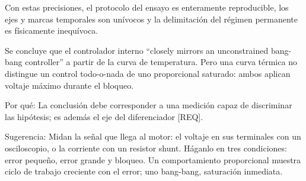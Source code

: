 \documentclass{LabDSTresponse}
\begin{document}
{\begin{enumerate}
\end{enumerate}
Con estas precisiones, el protocolo del ensayo es enteramente reproducible, los ejes y marcas temporales son unívocos y la delimitación del régimen permanente es físicamente inequívoca.}

{Se concluye que el controlador interno “closely mirrors an unconstrained bang-bang controller” a partir de la curva de temperatura. Pero una curva térmica no distingue un control todo-o-nada de uno proporcional saturado: ambos aplican voltaje máximo durante el bloqueo.

Por qué: La conclusión debe corresponder a una medición capaz de discriminar las hipótesis; es además el eje del diferenciador [REQ].

Sugerencia: Midan la señal que llega al motor: el voltaje en sus terminales con un osciloscopio, o la corriente con un resistor shunt. Háganlo en tres condiciones: error pequeño, error grande y bloqueo. Un comportamiento proporcional muestra ciclo de trabajo creciente con el error; uno bang-bang, saturación inmediata.}
\end{document}
